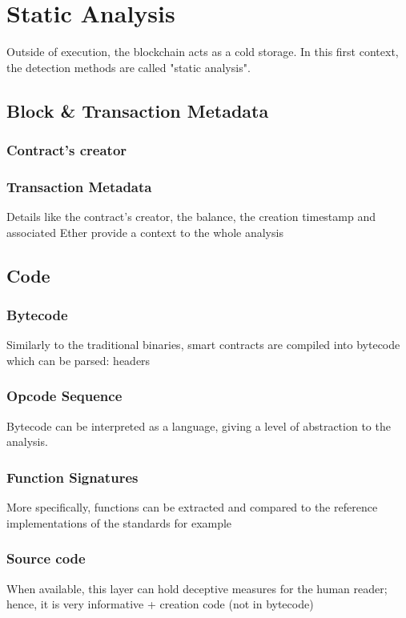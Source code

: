 \section{Static Analysis} \label{sec:data-static}

Outside of execution, the blockchain acts as a cold storage.
In this first context, the detection methods are called "static analysis".

\subsection{Block \& Transaction Metadata}

\subsubsection{Contract's creator}

\subsubsection{Transaction Metadata}

Details like the contract's creator, the balance, the creation timestamp and associated Ether provide a context to the whole analysis

\subsection{Code} \label{sec:static-code}

\subsubsection{Bytecode}

Similarly to the traditional binaries, smart contracts are compiled into bytecode which can be parsed: headers

\subsubsection{Opcode Sequence}

Bytecode can be interpreted as a language, giving a level of abstraction to the analysis.

\subsubsection{Function Signatures}

More specifically, functions can be extracted and compared to the reference implementations of the standards for example

\subsubsection{Source code}

When available, this layer can hold deceptive measures for the human reader; hence, it is very informative + creation code (not in bytecode)
